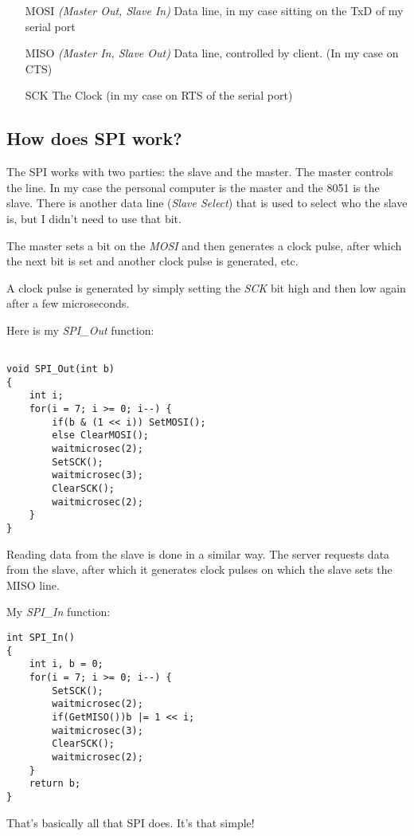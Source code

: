 \documentclass[a4paper]{article}
\begin{document}
\begin{itemize}
\item[MOSI] {\em (Master Out, Slave In)} Data line, in my case sitting on the TxD of my serial port
\item[MISO] {\em (Master In, Slave Out)} Data line, controlled by client. (In my case on CTS)
\item[SCK] The Clock (in my case on RTS of the serial port)
\end{itemize}

\subsection{How does SPI work?}

The SPI works with two parties: the slave and the master. The master controls 
the line. In my case the personal computer is the master and the 8051 is 
the slave. There is another data line ({\em Slave Select}) that is used to select 
who the slave is, but I didn't need to use that bit.

The master sets a bit on the {\em MOSI} and then generates a clock pulse, after 
which the next bit is set and another clock pulse is generated, etc.

A clock pulse is generated by simply setting the {\em SCK} bit high and then low 
again after a few microseconds.

Here is my {\em SPI\_Out} function:

\begin{lstlisting}

void SPI_Out(int b)
{
	int i;
	for(i = 7; i >= 0; i--) {
		if(b & (1 << i)) SetMOSI();
		else ClearMOSI();
		waitmicrosec(2);
		SetSCK();
		waitmicrosec(3);
		ClearSCK();
		waitmicrosec(2);
	}
}

\end{lstlisting}

Reading data from the slave is done in a similar way. The server requests 
data from the slave, after which it generates clock pulses on which the slave
sets the MISO line.

My {\em SPI\_In} function:

\begin{lstlisting}
int SPI_In()
{
	int i, b = 0;
	for(i = 7; i >= 0; i--) {
		SetSCK();
		waitmicrosec(2);
		if(GetMISO())b |= 1 << i;
		waitmicrosec(3);
		ClearSCK();
		waitmicrosec(2);
	}
	return b;
}
\end{lstlisting}

That's basically all that SPI does. It's that simple!
\end{document}
